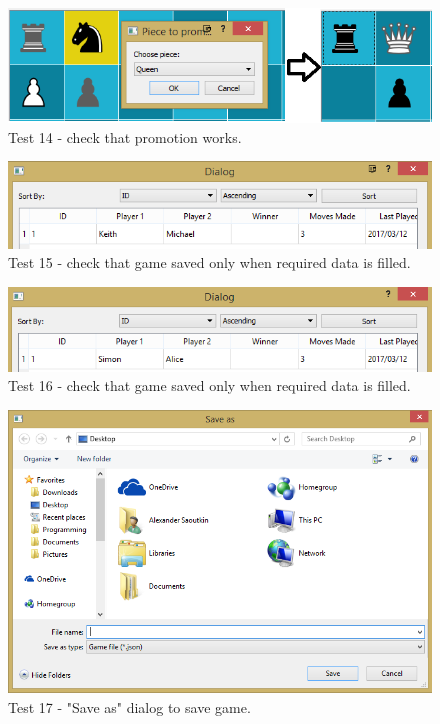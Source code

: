 \begin{figure}[H]
	\centering
	\includegraphics[width=1.0\textwidth]{images/screenshots/test-14}
	\caption{Test 14 - check that promotion works.}
	\label{test-14}
\end{figure}
\begin{figure}[H]
	\centering
	\includegraphics[width=1.0\textwidth]{images/screenshots/test-15}
	\caption{Test 15 - check that game saved only when required data is filled.}
	\label{test-15}
\end{figure}
\begin{figure}[H]
	\centering
	\includegraphics[width=1.0\textwidth]{images/screenshots/test-16}
	\caption{Test 16 - check that game saved only when required data is filled.}
	\label{test-16}
\end{figure}
\begin{figure}[H]
	\centering
	\includegraphics[width=1.0\textwidth]{images/screenshots/test-17}
	\caption{Test 17 - "Save as" dialog to save game.}
	\label{test-17}
\end{figure}
